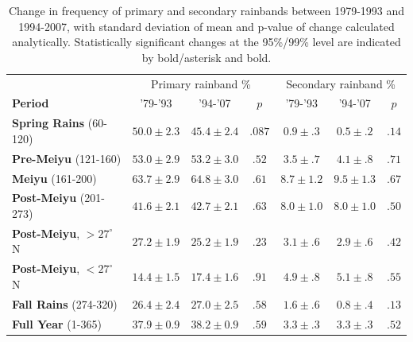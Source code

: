 \documentclass[final,grl]{agutexSI}
\begin{document}
\begin{table}

\centering

\caption{Change in frequency of primary and secondary rainbands between 1979-1993 and 1994-2007, with standard deviation of mean and p-value of change calculated analytically. Statistically significant changes at the 95\%/99\% level are indicated by bold/asterisk and bold.}

\begin{tabular}{ l c c c c c c}
	& \multicolumn{3}{c}{Primary rainband \%} & \multicolumn{3}{c}{Secondary rainband \%} \\
	\textbf{Period} & '79-'93 & '94-'07 & $p$ & '79-'93 & '94-'07 & $p$ \\
	\hline	
	\textbf{Spring Rains} (60-120)		& $50.0 \pm 2.3$ & $45.4 \pm 2.4$ & $ .087 $ 	& $0.9 \pm .3$ 	& $0.5 \pm .2$ & $.14$ \\
	\textbf{Pre-Meiyu} (121-160) 		& $53.0 \pm 2.9$ & $53.2 \pm 3.0$ & $ .52$ 	& $3.5 \pm .7$ 	& $4.1 \pm .8$ & $.71$ \\
	\textbf{Meiyu} (161-200)			& $63.7 \pm 2.9$ & $64.8 \pm 3.0$ & $ .61 $ 	& $8.7 \pm 1.2$ 	& $9.5 \pm 1.3$  & $.67$ \\
	\textbf{Post-Meiyu} (201-273)		& $41.6 \pm 2.1$ & $42.7 \pm 2.1$ & $ .63 $	& $8.0 \pm 1.0$ 	& $8.0 \pm 1.0$ & $.50$ \\
	\textbf{Post-Meiyu}, $>27^\circ$N 	& $27.2 \pm 1.9$ & $25.2 \pm 1.9$ & $ .23 $ 	& $3.1 \pm .6$ 	& $2.9 \pm .6$ & $.42$ \\
	\textbf{Post-Meiyu}, $<27^\circ$N 	& $14.4 \pm 1.5 $ & $17.4 \pm 1.6$ & $ .91 $ 	& $4.9 \pm .8$ 	& $5.1 \pm .8$ & $.55$  \\
	\textbf{Fall Rains} (274-320)			& $26.4 \pm 2.4 $ & $27.0 \pm 2.5$ & $ .58 $ 	& $1.6 \pm .6$ 	& $0.8 \pm .4$ & $.13$ \\
	\textbf{Full Year} (1-365)			& $37.9 \pm 0.9 $ & $38.2 \pm 0.9$ & $ .59 $ 	& $3.3 \pm .3$ 	& $3.3 \pm .3$ & $.52$ \\

\end{tabular}
\label{ts7}
\end{table}
\end{document}
